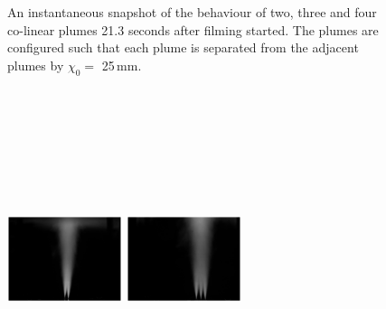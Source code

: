 \documentclass{jfm}
\begin{document}
\begin{figure}
		\vspace{-4em}
		\caption{ An instantaneous snapshot of the behaviour of two, three and four co-linear plumes 21.3 seconds after filming started. The plumes are configured such that each plume is separated from the adjacent plumes by $\chi_0 = $ 25\,mm.}
		\label{fig:instant snapshots}
	\end{figure}

    \begin{figure}
		\centering
			\includegraphics[trim = {5cm 0 5cm 2cm},clip,width = 0.3\textwidth, height = 10cm]{twoPlumeAverage.eps}
			\includegraphics[trim = {6.5cm 0cm 4.5cm 2cm},clip,width = 0.3\textwidth,height = 10cm]{threePlumeAverage.eps}

\end{figure}
\end{document}
